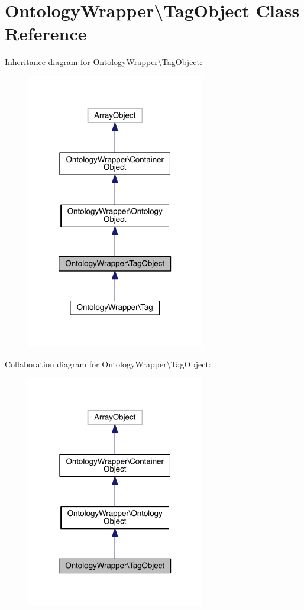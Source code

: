 \hypertarget{class_ontology_wrapper_1_1_tag_object}{\section{Ontology\-Wrapper\textbackslash{}Tag\-Object Class Reference}
\label{class_ontology_wrapper_1_1_tag_object}
}


Inheritance diagram for Ontology\-Wrapper\textbackslash{}Tag\-Object\-:\nopagebreak
\begin{figure}[H]
\begin{center}
\leavevmode
\includegraphics[width=220pt]{class_ontology_wrapper_1_1_tag_object__inherit__graph}
\end{center}
\end{figure}


Collaboration diagram for Ontology\-Wrapper\textbackslash{}Tag\-Object\-:\nopagebreak
\begin{figure}[H]
\begin{center}
\leavevmode
\includegraphics[width=220pt]{class_ontology_wrapper_1_1_tag_object__coll__graph}
\end{center}
\end{figure}
